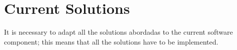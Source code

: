 





\section{Current Solutions}\label{sec:II_curr_solutions}
It is necessary to adapt all the solutions abordadas to the current software component; this means that all the solutions have to be implemented.

